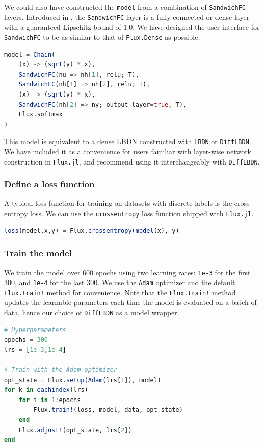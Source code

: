 We could also have constructed the \verb|model| from a combination of \verb|SandwichFC| layers. Introduced in \cite{Wang+Manchester2023}, the \verb|SandwichFC| layer is a fully-connected or dense layer with a guaranteed Lipschitz bound of 1.0. We have designed the user interface for \verb|SandwichFC| to be as similar to that of \verb|Flux.Dense| as possible.
\begin{lstlisting}[language = Julia]
model = Chain(
    (x) -> (sqrt(γ) * x),
    SandwichFC(nu => nh[1], relu; T),
    SandwichFC(nh[1] => nh[2], relu; T),
    (x) -> (sqrt(γ) * x),
    SandwichFC(nh[2] => ny; output_layer=true, T),
    Flux.softmax
)
\end{lstlisting}
This model is equivalent to a dense LBDN constructed with \verb|LBDN| or \verb|DiffLBDN|. We have included it as a convenience for users familiar with layer-wise network construction in \verb|Flux.jl|, and recommend using it interchangeably with \verb|DiffLBDN|.

\subsubsection{Define a loss function} \label{sec:mnist-loss}

A typical loss function for training on datasets with discrete labels is the cross entropy loss. We can use the \verb|crossentropy| loss function shipped with \verb|Flux.jl|.

\begin{lstlisting}[language = Julia]
loss(model,x,y) = Flux.crossentropy(model(x), y)
\end{lstlisting}

\subsubsection{Train the model} \label{sec:mnist-train}

We train the model over 600 epochs using two learning rates: \verb|1e-3| for the first 300, and \verb|1e-4| for the last 300. We use the \verb|Adam| optimizer \cite{Kingma+Ba2015} and the default \verb|Flux.train!| method for convenience. Note that the \verb|Flux.train!| method updates the learnable parameters each time the model is evaluated on a batch of data, hence our choice of \verb|DiffLBDN| as a model wrapper.

\begin{lstlisting}[language = Julia]
# Hyperparameters
epochs = 300
lrs = [1e-3,1e-4]

# Train with the Adam optimizer
opt_state = Flux.setup(Adam(lrs[1]), model)
for k in eachindex(lrs)
    for i in 1:epochs
        Flux.train!(loss, model, data, opt_state)
    end
    Flux.adjust!(opt_state, lrs[2])
end
\end{lstlisting}

